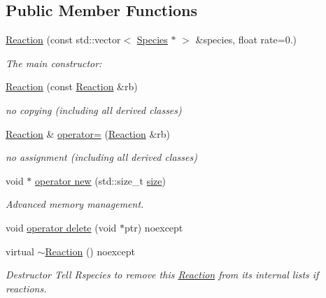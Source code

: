 \subsection*{Public Member Functions}
\begin{DoxyCompactItemize}
\item 
\hyperlink{classchem_1_1Reaction_a708a9cfbd5860423139b64ae7387a2b2}{Reaction} (const std\-::vector$<$ \hyperlink{classchem_1_1Species}{Species} $\ast$ $>$ \&species, float rate=0.)
\begin{DoxyCompactList}\small\item\em The main constructor\-: \end{DoxyCompactList}\item 
\hyperlink{classchem_1_1Reaction_a3da1e806c18d90f6f89b1ea2d469c172}{Reaction} (const \hyperlink{classchem_1_1Reaction}{Reaction} \&rb)
\begin{DoxyCompactList}\small\item\em no copying (including all derived classes) \end{DoxyCompactList}\item 
\hyperlink{classchem_1_1Reaction}{Reaction} \& \hyperlink{classchem_1_1Reaction_aea2276bdc0b66f5c3d3f890e894de8f9}{operator=} (\hyperlink{classchem_1_1Reaction}{Reaction} \&rb)
\begin{DoxyCompactList}\small\item\em no assignment (including all derived classes) \end{DoxyCompactList}\item 
void $\ast$ \hyperlink{classchem_1_1Reaction_a51fb1a27ae6f377d850561db5366a5c1}{operator new} (std\-::size\-\_\-t \hyperlink{classchem_1_1ReactionBase_a2d93483578ab0d29a2ec09920e7eeb94}{size})
\begin{DoxyCompactList}\small\item\em Advanced memory management. \end{DoxyCompactList}\item 
void \hyperlink{classchem_1_1Reaction_a229617078cca01b8b150e93718eb3b7f}{operator delete} (void $\ast$ptr) noexcept
\item 
virtual \hyperlink{classchem_1_1Reaction_a49e439ac62592b6c9bba5ec9ca6a8825}{$\sim$\-Reaction} () noexcept
\begin{DoxyCompactList}\small\item\em Destructor Tell Rspecies to remove this \hyperlink{classchem_1_1Reaction}{Reaction} from its internal lists if reactions. \end{DoxyCompactList}\item 

\end{DoxyCompactItemize}
